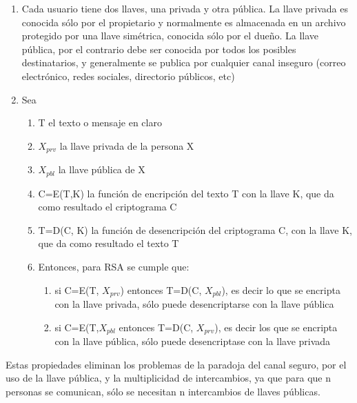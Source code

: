 \begin{enumerate}
\item Cada usuario tiene dos llaves, una privada y otra pública.  La
  llave privada es conocida sólo por el propietario y normalmente es
  almacenada en un archivo protegido por una llave simétrica, conocida
  sólo por el dueño.  La llave pública, por el contrario debe ser
  conocida por todos los posibles destinatarios, y generalmente se
  publica por cualquier canal inseguro (correo electrónico, redes
  sociales, directorio públicos, etc)
\item Sea
  \begin{enumerate}
  \item T el texto o mensaje en claro
  \item $X_{prv}$ la llave privada de la persona X
  \item $X_{pbl}$ la llave pública de X
  \item C=E(T,K) la función de encripción del texto T con la llave K,
    que da como resultado el criptograma C
  \item T=D(C, K) la función de desencripción del criptograma C, con
    la llave K, que da como resultado el texto T
  \item Entonces, para RSA se cumple que:
    \begin{enumerate}
    \item si C=E(T, $X_{prv}$) entonces T=D(C, $X_{pbl}$), es decir lo que se
      encripta con la llave privada, sólo puede desencriptarse con la
      llave pública
    \item si C=E(T,$X_{pbl}$ entonces T=D(C, $X_{prv}$), es decir los que se
      encripta con la llave pública, sólo puede desencriptase con la
      llave privada
    \end{enumerate}
  \end{enumerate}
\end{enumerate}

Estas propiedades eliminan los problemas de la paradoja del canal
seguro, por el uso de la llave pública, y la multiplicidad de
intercambios, ya que para que n personas se comunican, sólo se
necesitan n intercambios de llaves públicas.


